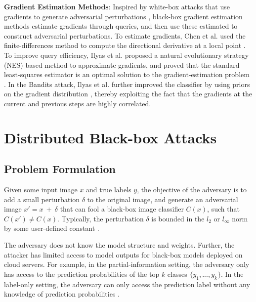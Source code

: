 \textbf{Gradient Estimation Methods}: Inspired by white-box attacks that use gradients to generate adversarial perturbations \citep{GoodfellowSS14} \citep{madry2017towards}, black-box gradient estimation methods estimate gradients through queries, and then use these estimated to construct adversarial perturbations. To estimate gradients, Chen et al. used the finite-differences method to compute the directional derivative at a local point \citep{chen2017zoo}. To improve query efficiency, Ilyas et al. proposed a natural evolutionary strategy (NES) \citep{wierstra2014nes} based method to approximate gradients, and proved that the standard least-squares estimator is an optimal solution to the gradient-estimation problem \citep{ilyas2018black}. In the Bandits attack, Ilyas et al. further improved the classifier by using priors on the gradient distribution \citep{ilyas2018prior}, thereby exploiting the fact that the gradients at the current and previous steps are highly correlated.



\section{Distributed Black-box Attacks}

\subsection{Problem Formulation}

Given some input image $x$ and true labels $y$, the objective of the adversary is to add a small perturbation $\delta$ to the original image, and generate an adversarial image $x' = x\ +\ \delta$ that can fool a black-box image classifier $C(x)$, such that $C(x') \neq C(x)$. Typically, the perturbation $\delta$ is bounded in the $l_2$ or $l_\infty$ norm by some user-defined constant \citep{bhambri2019survey}.

The adversary does not know the model structure and weights. Further, the attacker has limited access to model outputs for black-box models deployed on cloud servers. For example, in the partial-information setting, the adversary only has access to the prediction probabilities of the top $k$ classes $\{y_1, ..., y_k\}$. In the label-only setting, the adversary can only access the prediction label without any knowledge of prediction probabilities \citep{ilyas2018black}.


